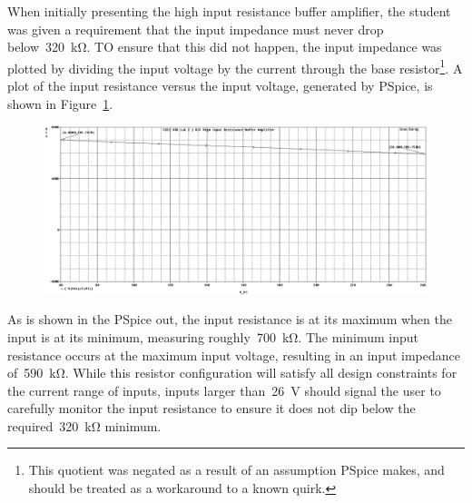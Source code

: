 When initially presenting the high input resistance buffer amplifier, the
student was given a requirement that the input impedance must never drop
below~\SI{320}{\kilo\ohm}.  TO ensure that this did not happen, the input
impedance was plotted by dividing the input voltage by the current through the
base resistor\footnote{This quotient was negated as a result of an assumption
PSpice makes, and should be treated as a workaround to a known quirk.}.  A plot
of the input resistance versus the input voltage, generated by PSpice, is shown
in Figure~\ref{fig:bjtPlotR}.
%
\begin{figure}[H]
	\centering
	\includegraphics[width=\pwidth]{img/plot/bjtPlotR.PNG}
	\parbox{\pwidth}{
	\caption{}
	\label{fig:bjtPlotR}}
\end{figure}
%
As is shown in the PSpice out, the input resistance is at its maximum when the
input is at its minimum, measuring roughly~\SI{700}{\kilo\ohm}.  The minimum
input resistance occurs at the maximum input voltage, resulting in an input
impedance of~\SI{590}{\kilo\ohm}.  While this resistor configuration will
satisfy all design constraints for the current range of inputs, inputs larger
than~\SI{26}{\volt} should signal the user to carefully monitor the input
resistance to ensure it does not dip below the required~\SI{320}{\kilo\ohm}
minimum.
